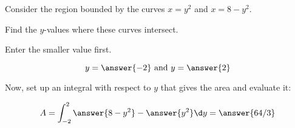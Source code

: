 \documentclass{ximera}
\author{Jason Miller}
\begin{document}
\begin{exercise}

Consider the region bounded by the curves $x=y^{2}$ and $x=8-y^{2}$. 

Find the $y$-values where these curves intersect.  
\begin{prompt}
Enter the smaller value first.
\end{prompt}

\[
y= \answer{-2} \text{  and  } y= \answer{2}
\]


Now, set up an integral with respect to $y$ that gives the area and evaluate it:

\[
A= \int_{-2}^{2} \answer{8-y^2} - \answer{y^2}  \d y = \answer{64/3}
\]



\end{exercise}
\end{document}
